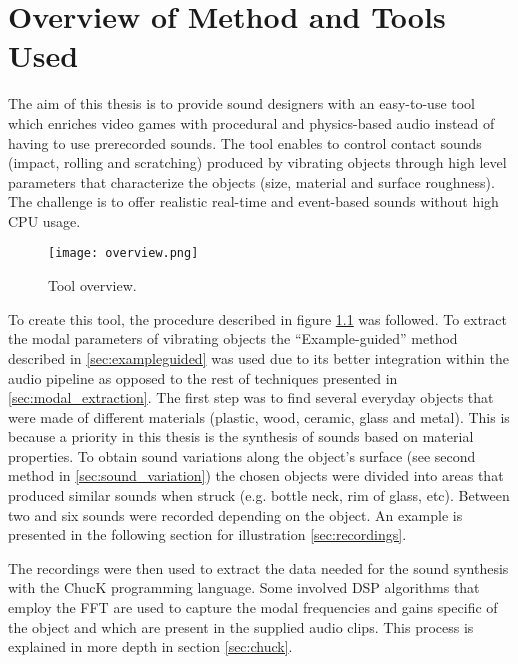 \chapter{Overview of Method and Tools Used}\label{ch:method}
The aim of this thesis is to provide sound designers with an easy-to-use tool which enriches video games with procedural and physics-based audio instead of having to use prerecorded sounds. The tool enables to control contact sounds (impact, rolling and scratching) produced by vibrating objects through high level parameters that characterize the objects (size, material and surface roughness). The challenge is to offer realistic real-time and event-based sounds without high CPU usage.

\begin{figure}[H]
  \centering
    \texttt{[image: overview.png]}
      \caption{Tool overview.}
      \label{fig:synth_proc}
\end{figure}

To create this tool, the procedure described in figure \ref{fig:synth_proc} was followed. To extract the modal parameters of vibrating objects the ``Example-guided'' method described in \ref{sec:exampleguided} was used due to its better integration within the audio pipeline as opposed to the rest of techniques presented in \ref{sec:modal_extraction}. The first step was to find several everyday objects that were made of different materials (plastic, wood, ceramic, glass and metal). This is because a priority in this thesis is the synthesis of sounds based on material properties. To obtain sound variations along the object's surface (see second method in \ref{sec:sound_variation}) the chosen objects were divided into areas that produced similar sounds when struck (e.g. bottle neck, rim of glass, etc). Between two and six sounds were recorded depending on the object. An example is presented in the following section for illustration \ref{sec:recordings}.

The recordings were then used to extract the data needed for the sound synthesis with the ChucK programming language. Some involved \gls{DSP} algorithms that employ the \gls{FFT} are used to capture the modal frequencies and gains specific of the object and which are present in the supplied audio clips. This process is explained in more depth in section \ref{sec:chuck}. 

